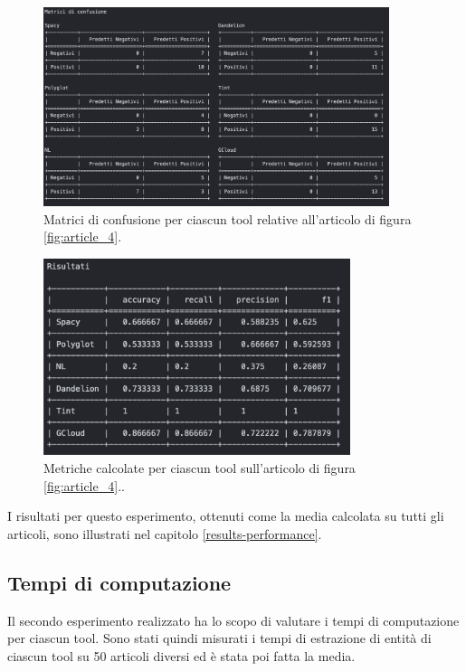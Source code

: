 \documentclass[a4paper,11pt]{article}
\begin{document}
\begin{figure}[H]
\centering
\includegraphics[width=0.9\textwidth]{img/matrici_confusione}
\caption{Matrici di confusione per ciascun tool relative all'articolo di figura \ref{fig:article_4}.}
\label{fig:confusion_matrixes}
\end{figure}

\begin{figure}[H]
\centering
\includegraphics[width=0.8\textwidth]{img/results_ex}
\caption{Metriche calcolate per ciascun tool sull'articolo di figura \ref{fig:article_4}..}
\label{fig:results_ex}
\end{figure}

I risultati per questo esperimento, ottenuti come la media calcolata su tutti gli articoli, sono illustrati nel capitolo \ref{results-performance}.

\subsection{Tempi di computazione}
Il secondo esperimento realizzato ha lo scopo di valutare i tempi di computazione per ciascun tool. Sono stati quindi misurati i tempi di estrazione di entità di ciascun tool su 50 articoli diversi ed è stata poi fatta la media.
\end{document}
